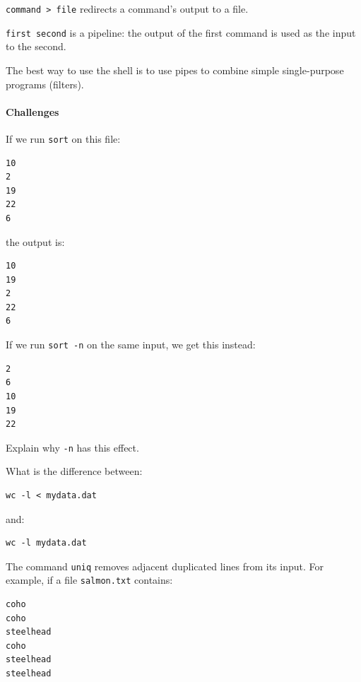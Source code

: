 \documentclass{book}
\begin{document}
\begin{swcitemize}
\item
  \texttt{command \textgreater{} file} redirects a command's output to a
  file.
\item
  \texttt{first \textbar{} second} is a pipeline: the output of the
  first command is used as the input to the second.
\item
  The best way to use the shell is to use pipes to combine simple
  single-purpose programs (filters).
\end{swcitemize}

\mbox{}\paragraph{Challenges}

\begin{swcenumerate}
\item
  If we run \texttt{sort} on this file:

\begin{verbatim}
10
2
19
22
6
\end{verbatim}

  the output is:

\begin{verbatim}
10
19
2
22
6
\end{verbatim}

  If we run \texttt{sort -n} on the same input, we get this instead:

\begin{verbatim}
2
6
10
19
22
\end{verbatim}

  Explain why \texttt{-n} has this effect.
\item
  What is the difference between:

\begin{verbatim}
wc -l < mydata.dat
\end{verbatim}

  and:

\begin{verbatim}
wc -l mydata.dat
\end{verbatim}
\item
  The command \texttt{uniq} removes adjacent duplicated lines from its
  input. For example, if a file \texttt{salmon.txt} contains:

\begin{verbatim}
coho
coho
steelhead
coho
steelhead
steelhead
\end{verbatim}


\end{swcenumerate}
\end{document}
